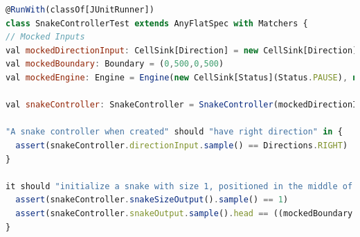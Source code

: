 \documentclass[../main.tex]{subfiles}
\begin{document}
\begin{lstlisting}[language=Javascript, caption=Esempio Test SnakeController - Unit testing codice FRP]
@RunWith(classOf[JUnitRunner])
class SnakeControllerTest extends AnyFlatSpec with Matchers {
// Mocked Inputs
val mockedDirectionInput: CellSink[Direction] = new CellSink[Direction](Directions.RIGHT)
val mockedBoundary: Boundary = (0,500,0,500)
val mockedEngine: Engine = Engine(new CellSink[Status](Status.PAUSE), new CellSink[Int](1))

val snakeController: SnakeController = SnakeController(mockedDirectionInput, mockedBoundary, mockedEngine)

"A snake controller when created" should "have right direction" in {
  assert(snakeController.directionInput.sample() == Directions.RIGHT)
}

it should "initialize a snake with size 1, positioned in the middle of the playground" in {
  assert(snakeController.snakeSizeOutput().sample() == 1)
  assert(snakeController.snakeOutput.sample().head == ((mockedBoundary._2/2).round,(mockedBoundary._4/2).round))
}
\end{lstlisting}
 
\end{document}
